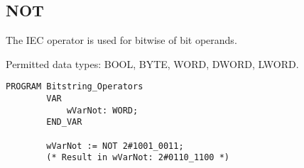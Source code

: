 \subsection{NOT} 

	
	
	The IEC operator is used for bitwise  of bit operands.
	
	Permitted data types: BOOL, BYTE, WORD, DWORD, LWORD.
	
	\begin{lstlisting}[language=ST ]
		PROGRAM Bitstring_Operators
		VAR 
			wVarNot: WORD;
		END_VAR
		
		wVarNot := NOT 2#1001_0011;
		(* Result in wVarNot: 2#0110_1100 *)
	\end{lstlisting}	 

